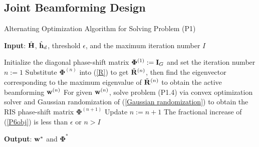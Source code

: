 \documentclass[draftclsnofoot,onecolumn,12pt]{IEEEtran}
\begin{document}
\subsection{Joint Beamforming Design}

\begin{algorithm}[t]
	\caption{Alternating Optimization Algorithm for Solving Problem (P1)} \label{alg2}
	\hspace*{\algorithmicindent}\textbf{Input}: $\hat{{\bf H}}$, $\hat{{\bf h}}_d$,  threshold $\epsilon$, and the maximum iteration number $I$
	\begin{algorithmic}[1]	
		\STATE Initialize the diagonal phase-shift matrix ${\bm \Phi}^{(1)}:={\bf I}_G$ and set the iteration number $n:=1$ 
		\REPEAT
		\STATE Substitute ${\bm \Phi}^{(n)}$ into (\ref{R}) to get $\tilde{\bf R}^{(n)}$, then find the eigenvector corresponding to the maximum eigenvalue of $\tilde{\bf R}^{(n)}$ to obtain the active beamforming ${\bf w}^{(n)}$ 
		\STATE For given ${\bf w}^{(n)}$, solve problem (P1.4) via convex optimization solver and Gaussian randomization of (\ref{Gaussian randomization}) to obtain the RIS phase-shift matrix ${\bm \Phi}^{(n+1)}$ 
		\STATE Update $n:=n+1$
		\UNTIL The fractional increase of (\ref{P6obj}) is less than {$\epsilon$} or $n>I$
	\end{algorithmic}
	\hspace*{\algorithmicindent} \textbf{Output}: ${\bf w}^*$ and ${\bm \Phi}^*$ 
\end{algorithm}
\end{document}

